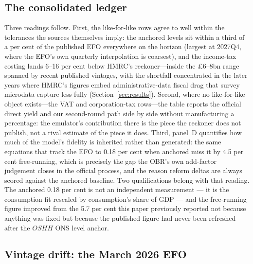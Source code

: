 \subsection{The consolidated ledger}

Three readings follow. First, the like-for-like rows agree to well within the tolerances the sources themselves imply: the anchored levels sit within a third of a per cent of the published EFO everywhere on the horizon (largest at 2027Q4, where the EFO's own quarterly interpolation is coarsest), and the income-tax costing lands 6--16 per cent below HMRC's reckoner---inside the \pounds 6--8bn range spanned by recent published vintages, with the shortfall concentrated in the later years where HMRC's figures embed administrative-data fiscal drag that survey microdata capture less fully (Section~\ref{sec:results}). Second, where no like-for-like object exists---the VAT and corporation-tax rows---the table reports the official direct yield and our second-round path side by side without manufacturing a percentage: the emulator's contribution there is the piece the reckoner does not publish, not a rival estimate of the piece it does. Third, panel~D quantifies how much of the model's fidelity is inherited rather than generated: the same equations that track the EFO to 0.18 per cent when anchored miss it by 4.5 per cent free-running, which is precisely the gap the OBR's own add-factor judgement closes in the official process, and the reason reform deltas are always scored against the anchored baseline. Two qualifications belong with that reading. The anchored 0.18 per cent is not an independent measurement --- it is the consumption fit rescaled by consumption's share of GDP --- and the free-running figure improved from the 5.7 per cent this paper previously reported not because anything was fixed but because the published figure had never been refreshed after the $OSHH$ ONS level anchor.

\subsection{Vintage drift: the March 2026 EFO}
\label{sec:vintagedrift}

